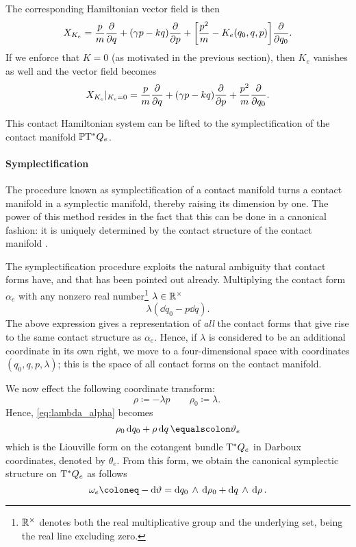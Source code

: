 The corresponding Hamiltonian vector field is then
\begin{equation}
    X_{K_e} = \frac{p}{m}\pdv{}{q} + (\gamma p - kq) \pdv{}{p} + \qty[\frac{p^2}{m} - K_e(q_0, q, p)]\pdv{}{q_0}. 
    \label{eq:ham_vf_e}
\end{equation}
If we enforce that $K = 0$ (as motivated in the previous section), then $K_e$ vanishes as well and the vector field becomes 
\begin{equation}
    X_{K_e}\vert_{K_e = 0} = \frac{p}{m}\pdv{}{q} + (\gamma p - kq) \pdv{}{p} + \frac{p^2}{m}\pdv{}{q_0}.
    \label{eq:ham_vf_e_liouville}
\end{equation}

This contact Hamiltonian system can be lifted to the symplectification of the contact manifold $\mathbb{P}\mathrm{T}^* Q_e$.

\paragraph{Symplectification} The procedure known as symplectification of a contact manifold turns a contact manifold in a symplectic manifold, thereby raising its dimension by one. The power of this method resides in the fact that this can be done in a canonical fashion: it is uniquely determined by the contact structure of the contact manifold \cite{Arnold1989}.

The symplectification procedure exploits the natural ambiguity that contact forms have, and that has been pointed out already. Multiplying the contact form $\alpha_e$ with any nonzero real number\footnote
{
    $\mathbb{R}^\times$ denotes both the real multiplicative group and the underlying set, being the real line excluding zero. 
} $\lambda \in \mathbb{R}^\times$
\begin{equation}
    \lambda (\dd{q_0} - p \dd{q}). 
    \label{eq:lambda_alpha}
\end{equation}
The above expression gives a representation of \emph{all} the contact forms that give rise to the same contact structure as $\alpha_e$. Hence, if $\lambda$ is considered to be an additional coordinate in its own right, we move to a four-dimensional space with coordinates $(q_0, q, p, \lambda)$; this is the space of all contact forms on the contact manifold. 

We now effect the following coordinate transform:
$$ \rho \coloneq -\lambda p \qquad \rho_0 \coloneq \lambda. \ $$ 
Hence, \cref{eq:lambda_alpha} becomes 
\begin{equation}
    \rho_0\dd{q_0} + \rho \dd{q} \equalscolon \theta_e
    \label{eq:liouville_form_extended}
\end{equation}
which is the Liouville form on the cotangent bundle $\mathrm{T}^*Q_e$ in Darboux coordinates, denoted by $\theta_e$. From this form, we obtain the canonical symplectic structure on 
$\mathrm{T}^*Q_e$ as follows
\begin{equation}
    \omega_e \coloneq -\dd{\theta} = \wedgep{\dd{q_0}}{\dd{\rho_0}} + \wedgep{\dd{q}}{\dd{\rho}}.
    \label{eq:symplectic_form_extended}
\end{equation}

